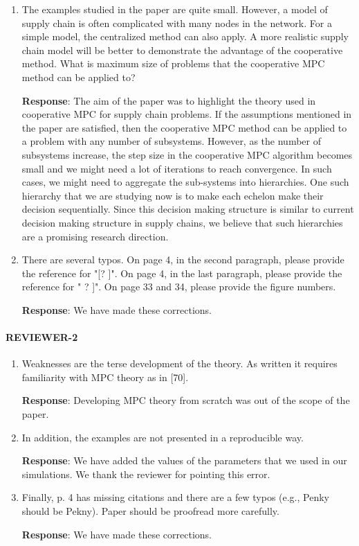 \documentclass{article}
\newcommand{\response}[1]{\textbf{Response}: #1}
\begin{document}
\begin{enumerate}
\item  The examples studied in the paper are quite small. However, a model of supply chain is often complicated with many nodes in the network. For a simple model, the centralized method can also apply. A more realistic supply chain model will be better to demonstrate the advantage of the cooperative method. What is maximum size of problems that the cooperative MPC method can be applied to?

\response{The aim of the paper was to highlight the theory used in cooperative MPC for supply chain problems. If the assumptions mentioned in the paper are satisfied, then the cooperative MPC method can be applied to a problem with any number of subsystems. However, as the number of subsystems increase, the step size in the cooperative MPC algorithm becomes small and we might need a lot of iterations to reach convergence. In such cases,  we might need to aggregate the sub-systems into hierarchies. One such hierarchy that we are studying now is to make each echelon make their decision sequentially. Since this decision making structure is similar to current decision making structure in supply chains, we believe that such  hierarchies are a promising research direction.}

\item There are several typos.
On page 4, in the second paragraph, please provide the reference for "[? ]".
On page 4, in the last paragraph, please provide the reference for " ? ]".
On page 33 and 34, please provide the figure numbers.

\response{ We have made these corrections.}

\end{enumerate}
\paragraph{REVIEWER-2}

\begin{enumerate}
\item Weaknesses are the terse development of the theory. As written it requires familiarity with MPC theory
as in [70].

\response{Developing MPC theory from scratch was out of the scope of the paper.}


\item In addition, the examples are not presented in a reproducible way.

\response{We have added the values of the parameters that we used in
  our simulations. We thank the reviewer for pointing this error.}

\item Finally, p. 4 has missing citations and there are a few typos (e.g., Penky should be Pekny).
Paper should be proofread more carefully.

\response{We have made these corrections.}
\end{enumerate}
\end{document}
